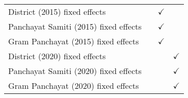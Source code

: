 \begin{tabular}{lccc}
   District (2015) fixed effects         &                                & $\checkmark$                   & \\  
   Panchayat Samiti (2015) fixed effects &                                & $\checkmark$                   & \\  
   Gram Panchayat (2015) fixed effects   &                                & $\checkmark$                   & \\  
   District (2020) fixed effects         &                                &                                & $\checkmark$\\   
   Panchayat Samiti (2020) fixed effects &                                &                                & $\checkmark$\\   
   Gram Panchayat (2020) fixed effects   &                                &                                & $\checkmark$\\   
   \bottomrule
\end{tabular}
\par\endgroup



